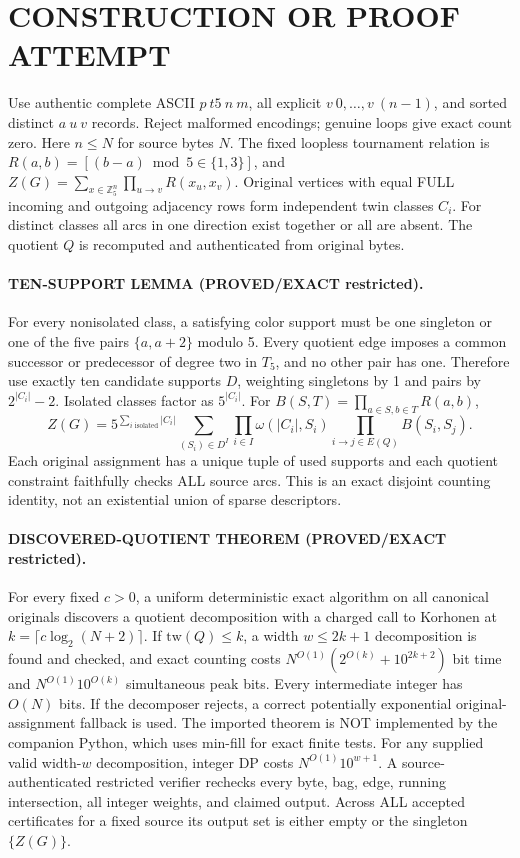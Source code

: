 \documentclass[11pt]{article}
\begin{document}
\section{CONSTRUCTION OR PROOF ATTEMPT}
Use authentic complete ASCII $p\ t5\ n\ m$, all explicit $v\ 0,\ldots,v\ (n-1)$, and sorted distinct $a\ u\ v$ records. Reject malformed encodings; genuine loops give exact count zero. Here $n\le N$ for source bytes $N$. The fixed loopless tournament relation is $R(a,b)=[(b-a)\bmod5\in\{1,3\}]$, and $Z(G)=\sum_{x\in\mathbb Z_5^n}\prod_{u\to v}R(x_u,x_v)$. Original vertices with equal FULL incoming and outgoing adjacency rows form independent twin classes $C_i$. For distinct classes all arcs in one direction exist together or all are absent. The quotient $Q$ is recomputed and authenticated from original bytes.
\paragraph{TEN-SUPPORT LEMMA (PROVED/EXACT restricted).}
For every nonisolated class, a satisfying color support must be one singleton or one of the five pairs $\{a,a+2\}$ modulo 5. Every quotient edge imposes a common successor or predecessor of degree two in $T_5$, and no other pair has one. Therefore use exactly ten candidate supports $D$, weighting singletons by 1 and pairs by $2^{|C_i|}-2$. Isolated classes factor as $5^{|C_i|}$. For $B(S,T)=\prod_{a\in S,b\in T}R(a,b)$,
\[
Z(G)=5^{\sum_{i\text{ isolated}}|C_i|}
\sum_{(S_i)\in D^I}\prod_{i\in I}\omega(|C_i|,S_i)
\prod_{i\to j\in E(Q)}B(S_i,S_j).
\]
Each original assignment has a unique tuple of used supports and each quotient constraint faithfully checks ALL source arcs. This is an exact disjoint counting identity, not an existential union of sparse descriptors.
\paragraph{DISCOVERED-QUOTIENT THEOREM (PROVED/EXACT restricted).}
For every fixed $c>0$, a uniform deterministic exact algorithm on all canonical originals discovers a quotient decomposition with a charged call to Korhonen at $k=\lceil c\log_2(N+2)\rceil$. If $\mathrm{tw}(Q)\le k$, a width $w\le2k+1$ decomposition is found and checked, and exact counting costs $N^{O(1)}(2^{O(k)}+10^{2k+2})$ bit time and $N^{O(1)}10^{O(k)}$ simultaneous peak bits. Every intermediate integer has $O(N)$ bits. If the decomposer rejects, a correct potentially exponential original-assignment fallback is used. The imported theorem is NOT implemented by the companion Python, which uses min-fill for exact finite tests. For any supplied valid width-$w$ decomposition, integer DP costs $N^{O(1)}10^{w+1}$. A source-authenticated restricted verifier rechecks every byte, bag, edge, running intersection, all integer weights, and claimed output. Across ALL accepted certificates for a fixed source its output set is either empty or the singleton $\{Z(G)\}$.
\end{document}
